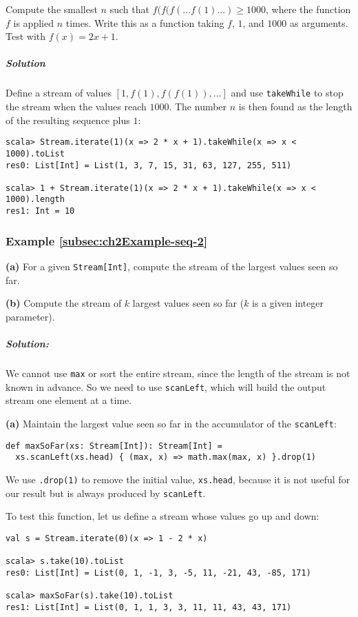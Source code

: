 Compute the smallest $n$ such that $f(f(f(...f(1)...)\geq1000$,
where the function $f$ is applied $n$ times. Write this as a function
taking $f$, $1$, and $1000$ as arguments. Test with $f(x)=2x+1$.

\subparagraph{Solution}

Define a stream of values $\left[1,f(1),f(f(1)),...\right]$ and use
\lstinline!takeWhile! to stop the stream when the values reach $1000$.
The number $n$ is then found as the length of the resulting sequence
plus $1$: 
\begin{lstlisting}
scala> Stream.iterate(1)(x => 2 * x + 1).takeWhile(x => x < 1000).toList
res0: List[Int] = List(1, 3, 7, 15, 31, 63, 127, 255, 511)

scala> 1 + Stream.iterate(1)(x => 2 * x + 1).takeWhile(x => x < 1000).length
res1: Int = 10
\end{lstlisting}


\subsubsection{Example \label{subsec:ch2Example-seq-2}\ref{subsec:ch2Example-seq-2}}

\textbf{(a)} For a given \lstinline!Stream[Int]!, compute the stream
of the largest values seen so far.

\textbf{(b)} Compute the stream of $k$ largest values seen so far
($k$ is a given integer parameter).

\subparagraph{Solution:}

We cannot use \lstinline!max! or sort the entire stream, since the
length of the stream is not known in advance. So we need to use \lstinline!scanLeft!,
which will build the output stream one element at a time.

\textbf{(a)} Maintain the largest value seen so far in the accumulator
of the \lstinline!scanLeft!:
\begin{lstlisting}
def maxSoFar(xs: Stream[Int]): Stream[Int] =
  xs.scanLeft(xs.head) { (max, x) => math.max(max, x) }.drop(1)
\end{lstlisting}
We use \lstinline!.drop(1)! to remove the initial value, \lstinline!xs.head!,
because it is not useful for our result but is always produced by
\lstinline!scanLeft!.

To test this function, let us define a stream whose values go up and
down:
\begin{lstlisting}
val s = Stream.iterate(0)(x => 1 - 2 * x)

scala> s.take(10).toList
res0: List[Int] = List(0, 1, -1, 3, -5, 11, -21, 43, -85, 171)

scala> maxSoFar(s).take(10).toList
res1: List[Int] = List(0, 1, 1, 3, 3, 11, 11, 43, 43, 171)
\end{lstlisting}

